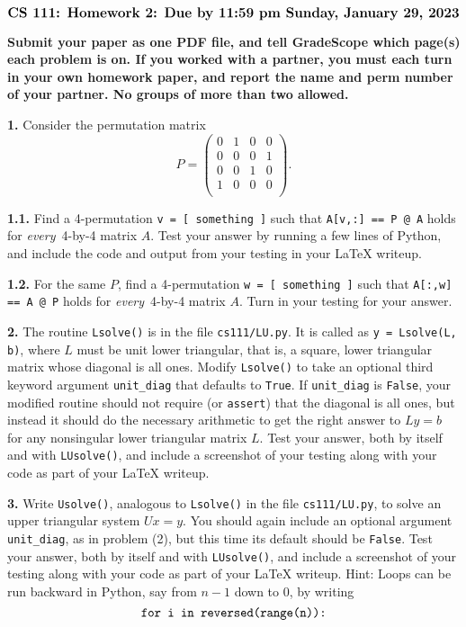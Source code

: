 \documentclass[11pt]{article}
\begin{document}
$$\mbox{\Large \bf CS 111: Homework 2: Due by 11:59 pm Sunday, January 29, 2023}$$
\par\smallskip\noindent
{\bf Submit your paper as one PDF file,
and tell GradeScope which page(s) each problem is on.
If you worked with a partner, you must each turn in your own 
homework paper, and report the name and perm number of your partner.
No groups of more than two allowed.
}

\par\bigskip
{\bf 1.} Consider the permutation matrix 
$$P =
   \left(
   \begin{array}{cccc}
    0 & 1 & 0 & 0 \\ 	
    0 & 0 & 0 & 1 \\ 	
    0 & 0 & 1 & 0 \\ 	
    1 & 0 & 0 & 0 \\ 	
   \end{array} \right).
$$

\par\medskip
{\bf 1.1.}
Find a 4-permutation {\tt v = [ something ]}
such that {\tt A[v,:] == P @ A} holds for
{\em every}\, 4-by-4 matrix $A$.
Test your answer by running a few lines of Python, 
and include the code and output from your testing
in your LaTeX writeup.

\par\medskip
{\bf 1.2.} For the same $P$, 
find a 4-permutation {\tt w = [ something ]}
such that {\tt A[:,w] == A @ P} holds for
{\em every}\, 4-by-4 matrix $A$.
Turn in your testing for your answer.

\par\bigskip
{\bf 2.}
The routine {\tt Lsolve()} is in the file {\tt cs111/LU.py}.
It is called as {\tt y = Lsolve(L, b)}, where $L$ must be
unit lower triangular, that is,
a square, lower triangular matrix whose diagonal is all ones.
Modify {\tt Lsolve()} to take an optional third keyword argument
{\tt unit\_diag} that defaults to {\tt True}. 
If {\tt unit\_diag} is {\tt False}, 
your modified routine should not require (or {\tt assert}) 
that the diagonal is all ones, but instead it should do
the necessary arithmetic to get the right answer to $Ly=b$
for any nonsingular lower triangular matrix $L$. 
Test your answer, both by itself and with {\tt LUsolve()},
and include a screenshot of your testing along with
your code as part of your LaTeX writeup.

\par\bigskip
{\bf 3.}
Write {\tt Usolve()}, analogous to {\tt Lsolve()} in the file {\tt cs111/LU.py},
to solve an upper triangular system $Ux=y$. 
You should again include an optional argument {\tt unit\_diag},
as in problem (2), but this time its default should be {\tt False}.
Test your answer, both by itself and with {\tt LUsolve()},
and include a screenshot of your testing along with
your code as part of your LaTeX writeup.
Hint: Loops can be run backward in Python, 
say from $n-1$ down to $0$, by writing
$$\mbox{\tt for i in reversed(range(n)):}$$
\end{document}
